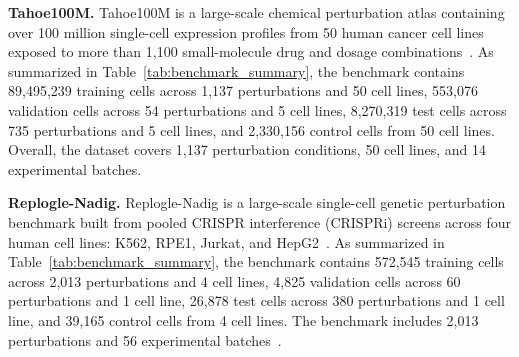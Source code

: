 \documentclass[11pt]{article}
\begin{document}

\textbf{Tahoe100M.} Tahoe100M is a large-scale chemical perturbation atlas containing over 100 million single-cell expression profiles from 50 human cancer cell lines exposed to more than 1,100 small-molecule drug and dosage combinations~\cite{zhang2025tahoe100m}. As summarized in Table~\ref{tab:benchmark_summary}, the benchmark contains 89,495,239 training cells across 1,137 perturbations and 50 cell lines, 553,076 validation cells across 54 perturbations and 5 cell lines, 8,270,319 test cells across 735 perturbations and 5 cell lines, and 2,330,156 control cells from 50 cell lines. Overall, the dataset covers 1,137 perturbation conditions, 50 cell lines, and 14 experimental batches.

\textbf{Replogle-Nadig.} Replogle-Nadig is a large-scale single-cell genetic perturbation benchmark built from pooled CRISPR interference (CRISPRi) screens across four human cell lines: K562, RPE1, Jurkat, and HepG2~\cite{nadig2025transcriptomewide,gilbert2013crispri}. As summarized in Table~\ref{tab:benchmark_summary}, the benchmark contains 572,545 training cells across 2,013 perturbations and 4 cell lines, 4,825 validation cells across 60 perturbations and 1 cell line, 26,878 test cells across 380 perturbations and 1 cell line, and 39,165 control cells from 4 cell lines. The benchmark includes 2,013 perturbations and 56 experimental batches~\cite{yuan2026perturbdiff}.
\end{document}

